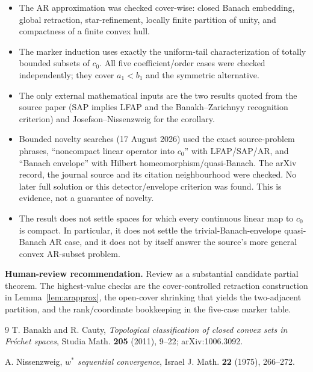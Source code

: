 \documentclass[11pt]{article}
\begin{document}
\begin{itemize}
\item The AR approximation was checked cover-wise: closed Banach embedding,
global retraction, star-refinement, locally finite partition of unity, and
compactness of a finite convex hull.
\item The marker induction uses exactly the uniform-tail characterization of
totally bounded subsets of $c_0$.  All five coefficient/order cases were
checked independently; they cover $a_1<b_1$ and the symmetric alternative.
\item The only external mathematical inputs are the two results quoted from
the source paper (SAP implies LFAP and the Banakh--Zarichnyy recognition
criterion) and Josefson--Nissenzweig for the corollary.
\item Bounded novelty searches (17 August 2026) used the exact source-problem
phrases, ``noncompact linear operator into $c_0$'' with LFAP/SAP/AR, and
``Banach envelope'' with Hilbert homeomorphism/quasi-Banach.  The arXiv
record, the journal source and its citation neighbourhood were checked.  No
later full solution or this detector/envelope criterion was found.  This is
evidence, not a guarantee of novelty.
\item The result does not settle spaces for which every continuous linear
map to $c_0$ is compact.  In particular, it does not settle the
trivial-Banach-envelope quasi-Banach AR case, and it does not by itself answer
the source's more general convex AR-subset problem.
\end{itemize}

\noindent\textbf{Human-review recommendation.}
Review as a substantial candidate partial theorem.  The highest-value checks
are the cover-controlled retraction construction in Lemma~\ref{lem:arapprox},
the open-cover shrinking that yields the two-adjacent partition, and the
rank/coordinate bookkeeping in the five-case marker table.

\begin{thebibliography}{9}
T. Banakh and R. Cauty,
\emph{Topological classification of closed convex sets in Fr\'echet spaces},
Studia Math. \textbf{205} (2011), 9--22; arXiv:1006.3092.

A. Nissenzweig,
\emph{$w^*$ sequential convergence},
Israel J. Math. \textbf{22} (1975), 266--272.
\end{thebibliography}
\end{document}
